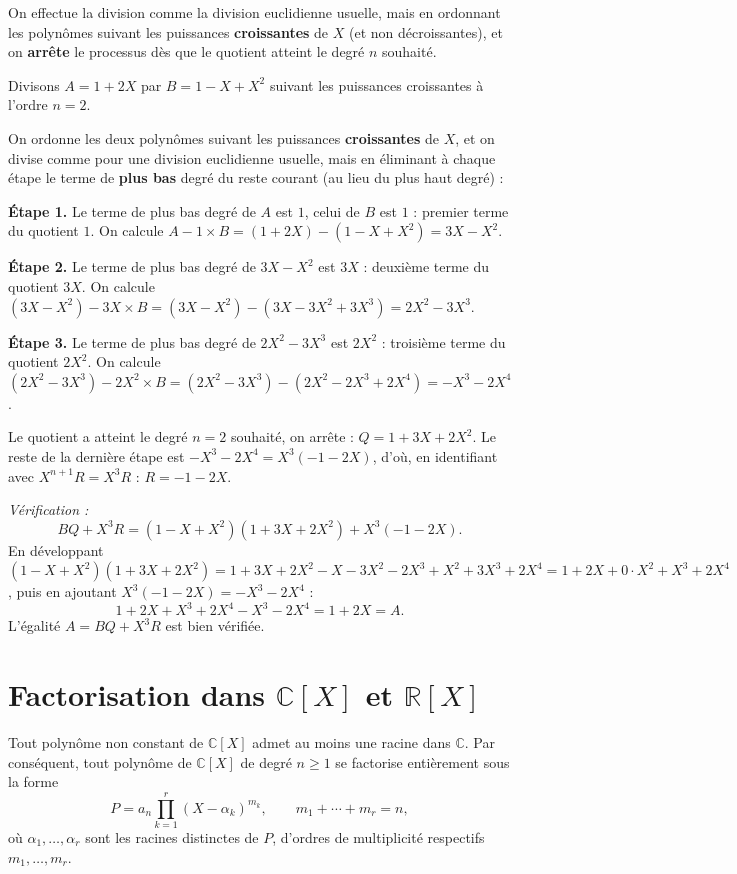 \documentclass[a4paper,12pt,openany]{book}
\begin{document}
\begin{remarque}
On effectue la division comme la division euclidienne usuelle, mais en
ordonnant les polynômes suivant les puissances \textbf{croissantes} de
$X$ (et non décroissantes), et on \textbf{arrête} le processus dès que le
quotient atteint le degré $n$ souhaité.
\end{remarque}

\begin{exemple}[7.3]
Divisons $A=1+2X$ par $B=1-X+X^2$ suivant les puissances croissantes à
l'ordre $n=2$.

On ordonne les deux polynômes suivant les puissances \textbf{croissantes}
de $X$, et on divise comme pour une division euclidienne usuelle, mais en
éliminant à chaque étape le terme de \textbf{plus bas} degré du reste
courant (au lieu du plus haut degré) :

\textbf{Étape 1.} Le terme de plus bas degré de $A$ est $1$, celui de $B$
est $1$ : premier terme du quotient $1$. On calcule $A - 1\times B =
(1+2X) - (1-X+X^2) = 3X-X^2$.

\textbf{Étape 2.} Le terme de plus bas degré de $3X-X^2$ est $3X$ :
deuxième terme du quotient $3X$. On calcule $(3X-X^2) - 3X\times B =
(3X-X^2) - (3X-3X^2+3X^3) = 2X^2-3X^3$.

\textbf{Étape 3.} Le terme de plus bas degré de $2X^2-3X^3$ est $2X^2$ :
troisième terme du quotient $2X^2$. On calcule $(2X^2-3X^3) - 2X^2\times
B = (2X^2-3X^3) - (2X^2-2X^3+2X^4) = -X^3-2X^4$.

Le quotient a atteint le degré $n=2$ souhaité, on arrête : $Q =
1+3X+2X^2$. Le reste de la dernière étape est $-X^3-2X^4 = X^3(-1-2X)$,
d'où, en identifiant avec $X^{n+1}R = X^3R$ : $R = -1-2X$.

\emph{Vérification :}
\[
BQ + X^3R = (1-X+X^2)(1+3X+2X^2) + X^3(-1-2X).
\]
En développant $(1-X+X^2)(1+3X+2X^2) = 1+3X+2X^2-X-3X^2-2X^3+X^2+3X^3+2X^4
= 1+2X+0\cdot X^2+X^3+2X^4$, puis en ajoutant $X^3(-1-2X)=-X^3-2X^4$ :
\[
1+2X+X^3+2X^4-X^3-2X^4 = 1+2X = A.
\]
L'égalité $A=BQ+X^3R$ est bien vérifiée.
\end{exemple}

\section{Factorisation dans \texorpdfstring{$\mathbb{C}[X]$}{C[X]} et \texorpdfstring{$\mathbb{R}[X]$}{R[X]}}

\begin{theoreme}
Tout polynôme non constant de $\mathbb{C}[X]$ admet au moins une racine
dans $\mathbb{C}$. Par conséquent, tout polynôme de $\mathbb{C}[X]$ de
degré $n\geq1$ se factorise entièrement sous la forme
\[
P = a_n \prod_{k=1}^{r} (X-\alpha_k)^{m_k}, \qquad m_1+\cdots+m_r = n,
\]
où $\alpha_1,\dots,\alpha_r$ sont les racines distinctes de $P$, d'ordres
de multiplicité respectifs $m_1,\dots,m_r$.
\end{theoreme}
\end{document}
